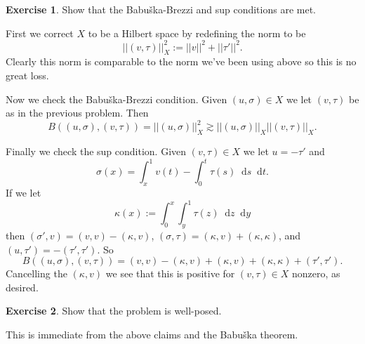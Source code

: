 \documentclass[10pt]{article}
\newcommand*\dif{\mathop{}\!\mathrm{d}}
\theoremstyle{definition}
\newtheorem{exer}{Exercise}
\begin{document}
\begin{exer}
    Show that the Babuška-Brezzi and sup conditions are met.
\end{exer}

First we correct $X$ to be a Hilbert space by redefining the norm to be 
$$||(v, \tau)||_X^2 := ||v||^2 + ||\tau'||^2.$$
Clearly this norm is comparable to the norm we've been using above so this is no great loss.

Now we check the Babuška-Brezzi condition.
Given $(u, \sigma) \in X$ we let $(v, \tau)$ be as in the previous problem. Then
$$B((u, \sigma), (v, \tau)) = ||(u, \sigma)||_X^2 \gtrsim ||(u, \sigma)||_X ||(v, \tau)||_X.$$

Finally we check the sup condition.
Given $(v, \tau) \in X$ we let $u = -\tau'$ and 
$$\sigma(x) = \int_x^1 v(t) - \int_0^t \tau(s) \dif s \dif t.$$
If we let 
$$\kappa(x) := \int_0^x \int_y^1 \tau(z) \dif z \dif y$$
then $(\sigma', v) = (v, v) - (\kappa, v)$, $(\sigma, \tau) = (\kappa, v) + (\kappa, \kappa)$, and $(u, \tau') = -(\tau', \tau')$.
So
$$B((u, \sigma), (v, \tau)) = (v, v) - (\kappa, v) + (\kappa, v) + (\kappa, \kappa) + (\tau', \tau').$$
Cancelling the $(\kappa, v)$ we see that this is positive for $(v, \tau) \in X$ nonzero, as desired.

\begin{exer}
    Show that the problem is well-posed.
\end{exer}

This is immediate from the above claims and the Babuška theorem.
\end{document}
